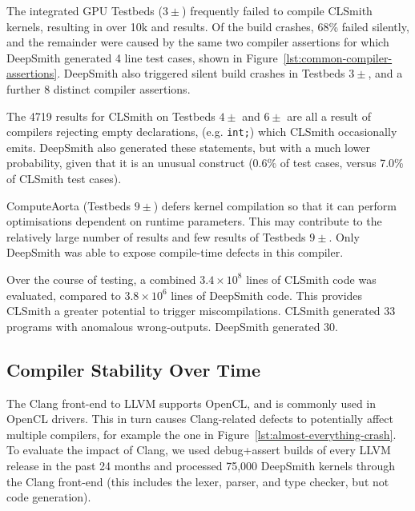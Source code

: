 

The integrated GPU Testbeds ($3\pm$) frequently failed to compile CLSmith kernels, resulting in over 10k \bc and \bto results. Of the build crashes, 68\% failed silently, and the remainder were caused by the same two compiler assertions for which DeepSmith generated 4 line test cases, shown in Figure~\ref{lst:common-compiler-assertions}. DeepSmith also triggered silent build crashes in Testbeds $3\pm$, and a further 8 distinct compiler assertions.

The 4719 \abf results for CLSmith on Testbeds $4\pm$ and $6\pm$ are all a result of compilers rejecting empty declarations, (e.g. \texttt{int;}) which CLSmith occasionally emits. DeepSmith also generated these statements, but with a much lower probability, given that it is an unusual construct (0.6\% of test cases, versus 7.0\% of CLSmith test cases).

ComputeAorta (Testbeds $9\pm$) defers kernel compilation so that it can perform optimisations dependent on runtime parameters. This may contribute to the relatively large number of \arc results and few \bc results of Testbeds $9\pm$. Only DeepSmith was able to expose compile-time defects in this compiler.

Over the course of testing, a combined $3.4 \times 10^8$ lines of CLSmith code was evaluated, compared to $3.8 \times 10^6$ lines of DeepSmith code. This provides CLSmith a greater potential to trigger miscompilations. CLSmith generated 33 programs with anomalous wrong-outputs. DeepSmith generated 30.


\subsection{Compiler Stability Over Time}%
\label{subsec:clangs}

The Clang front-end to LLVM supports OpenCL, and is commonly used in OpenCL drivers. This in turn causes Clang-related defects to potentially affect multiple compilers, for example the one in Figure~\ref{lst:almost-everything-crash}. To evaluate the impact of Clang, we used debug+assert builds of every LLVM release in the past 24 months and processed 75,000 DeepSmith kernels through the Clang front-end (this includes the lexer, parser, and type checker, but not code generation).


